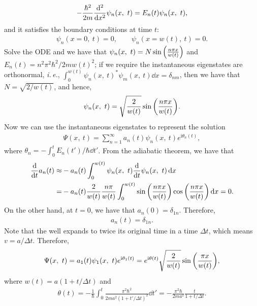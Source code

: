 \documentclass{article}
\newcommand{\iu}{\ensuremath{\mathrm{i}}}
\begin{document}
\begin{enumerate}[1.]
\begin{enumerate}[(i)]
    \begin{align*}
      -\frac{\hbar^2}{2m}\dv[2]{x}\psi_n(x,\ t) = E_n(t) \psi_n(x,\ t),
    \end{align*}
    and it satisfies the boundary conditions at time $t$:
    \begin{align*}
      \psi_n(x=0,\ t) = 0, \qquad \psi_n(x=w(t),\ t) = 0.
    \end{align*}
    Solve the ODE and we have that $\psi_n(x,\ t) = N\sin\qty(\frac{n\pi x}{w(t)})$ and $E_n(t) = n^2\pi^2\hbar^2/2mw(t)^2$; if we require the instantaneous eigenstates are orthonormal, \emph{i.\,e.}, $\int_0^{w(t)} \psi_n(x,\ t)^* \psi_m(x,\ t)  \dd{x} = \delta_{nm}$, then we have that $N = \sqrt{2/w(t)}$, and hence, 
    \begin{align*}
      \psi_n(x,\ t) = \sqrt{\frac{2}{w(t)}}\sin\qty(\frac{n\pi x}{w(t)}).
    \end{align*}
    Now we can use the instantaneous eigenstates to represent the solution
    \begin{align*}
      \Psi (x,\ t) = \sum_{n=1}^\infty a_n(t)\psi_{n}(x,\ t) e^{\iu\theta_{n}(t)},
    \end{align*}
    where $\theta_n = -\int_0^t E_n(t')/\hbar \dd{t'}$.
    From the adiabatic theorem, we have that
    \begin{align*}
      \dv{t} a_n(t) \approx& -a_n(t) \int_0^{w(t)} \psi_{n}(x,\ t) \dv{t} \psi_{n}(x,\ t) \dd{x}\\
      =&  -a_n(t) \frac{2}{w(t)} \frac{n\pi}{w(t)} \int_0^{w(t)} \sin\qty(\frac{n\pi x}{w(t)})\cos\qty(\frac{n\pi x}{w(t)}) \dd{x} 
      =0.
    \end{align*}
    On the other hand, at $t = 0$, we have that $a_n(0) = \delta_{1n}$. Therefore,
    \begin{align*}
      a_n(t) = \delta_{1n}.
    \end{align*}
    Note that the well expands to twice its original time in a time $\Delta t$, which means $v = a/\Delta t$. Therefore,
    \begin{align*}
      \Psi(x,\ t) = a_1(t)\psi_{1}(x,\ t) e^{\iu\theta_{1}(t)} = e^{\iu\theta(t)} \sqrt{\frac{2}{w(t)}}\sin\qty(\frac{\pi x}{w(t)}),
    \end{align*}
    where $w(t) = a(1+t/\Delta t)$ and 
    \begin{align*}
      \theta(t) = -\frac{1}{\hbar} \int_0^t \frac{\pi^2\hbar^2}{2ma^2(1+t'/\Delta t)^2}\dd{t'} = -\frac{\pi^2\hbar}{2ma^2} \frac{t}{1 + t/\Delta t}. 
    \end{align*}


\end{enumerate}
\end{enumerate}
\end{document}
